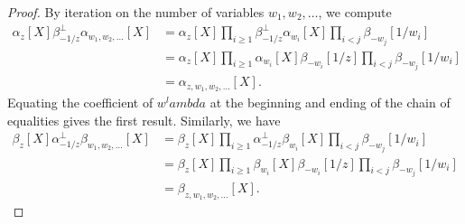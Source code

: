 \documentclass[12pt]{amsart}%
\def\lambda{lambda}%
\theoremstyle{remark}
\theoremstyle{definition}
\begin{document}
    \begin{proof}
        By iteration on the number of variables $w_1,w_2,\ldots$, we compute
        \begin{align*}
            \alpha_z[X]\beta_{-1/z}^\perp \alpha_{w_1,w_2,\ldots}[X]
            &=\alpha_z[X]\prod_{i\geq1}\beta_{-1/z}^\perp\alpha_{w_i}[X]\prod_{i<j}\beta_{-w_j}[1/w_i]\\
            &=\alpha_z[X]\prod_{i\geq1}\alpha_{w_i}[X]\beta_{-w_i}[1/z]\prod_{i<j}\beta_{-w_j}[1/w_i]\\
            &=\alpha_{z,w_1,w_2,\ldots}[X].
        \end{align*}
        Equating the coefficient of $w^\lambda$ at the beginning and ending of the chain of equalities gives the first result. Similarly, we have
        \begin{align*}
            \beta_z[X]\alpha_{-1/z}^\perp \beta_{w_1,w_2,\ldots}[X]
            &=\beta_z[X]\prod_{i\geq1}\alpha_{-1/z}^\perp\beta_{w_i}[X]\prod_{i<j}\beta_{-w_j}[1/w_i]\\
            &=\beta_z[X]\prod_{i\geq1}\beta_{w_i}[X]\beta_{-w_i}[1/z]\prod_{i<j}\beta_{-w_j}[1/w_i]\\
            &=\beta_{z,w_1,w_2,\ldots}[X].
        \end{align*}
    \end{proof}
    
\end{document}
